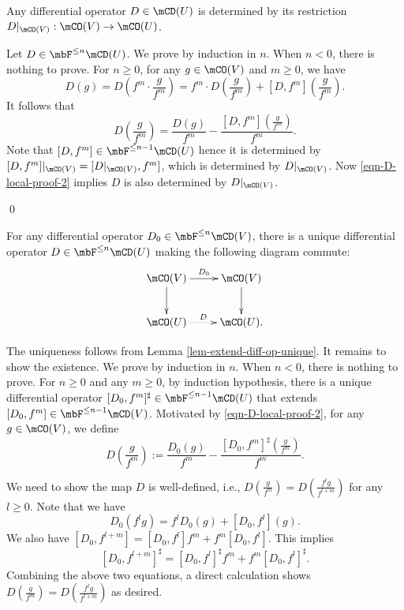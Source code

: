 	\begin{lem}
		\label{lem-extend-diff-op-unique}
		Any differential operator $D\in \mCD(U)$ is determined by its restriction $D|_{\mCO(V)}: \mCO(V) \to \mCO(U)$.
	\end{lem}

	\proof
		Let $D\in \mbF^{\le n} \mCD(U) $. We prove by induction in $n$. When $n<0$, there is nothing to prove. For $n\ge 0$, for any $g\in \mCO(V)$ and $m\ge 0$, we have
		\begin{equation}
			\label{eqn-D-local-proof-1}
			D(g) = D(f^m \cdot \frac{g}{f^m}) = f^m \cdot D(\frac{g}{f^m}) + [D,f^m](  \frac{g}{f^m}).
		\end{equation}
		It follows that
		\begin{equation}
			\label{eqn-D-local-proof-2}
			D(\frac{g}{f^m}) = \frac{D(g)}{f^m} - \frac{[D,f^m](  \frac{g}{f^m})}{f^m}.
		\end{equation}
		Note that $[D,f^m]\in \mbF^{\le n-1} \mCD(U)$ hence it is determined by $[D,f^m]|_{\mCO(V)} = [D|_{\mCO(V)}, f^m]$, which is determined by $D|_{\mCO(V)}$. Now \eqref{eqn-D-local-proof-2} implies $D$ is also determined by $D|_{\mCO(V)}$.

	\qed

	\begin{lem}
		\label{lem-extend-diff-op-exist}
		For any differential operator $D_0 \in \mbF^{\le n}\mCD(V)$, there is a unique differential operator $D\in \mbF^{\le n}\mCD(U)$ making the following diagram commute:
		\[
			\xymatrix{
				\mCO(V) \ar[d] \ar[r]^-{D_0} & \mCO(V) \ar[d]  \\
				\mCO(U) \ar@{.>}[r]^-D & \mCO(U).
			}
		\]
	\end{lem}

	\proof
		The uniqueness follows from Lemma \ref{lem-extend-diff-op-unique}. It remains to show the existence. We prove by induction in $n$. When $n<0$, there is nothing to prove. For $n\ge 0$ and any $m\ge 0$, by induction hypothesis, there is a unique differential operator $[D_0,f^m]^\sharp\in  \mbF^{\le n-1}\mCD(U)$ that extends $[D_0,f^m]\in \mbF^{\le n-1}\mCD(V)$. Motivated by \eqref{eqn-D-local-proof-2}, for any $g\in \mCO(V)$, we define
		\[
			D(\frac{g}{f^m}) := \frac{D_0(g)}{f^m} - \frac{[D_0,f^m]^\sharp(  \frac{g}{f^m})}{f^m}.
		\]

		We need to show the map $D$ is well-defined, i.e., $D(\frac{g}{f^m}) = D(\frac{f^lg}{f^{l+m}})$ for any $l\ge 0$. Note that we have 
		\[
			D_0(f^l g) = f^l D_0(g) + [D_0,f^l](g).
		\]
		We also have $[D_0, f^{l+m}] = [D_0,f^l] f^m + f^m [D_0, f^l]$. This implies 
		\[
			[D_0, f^{l+m}]^\sharp = [D_0,f^l]^\sharp f^m + f^m [D_0, f^l]^\sharp.
		\] 
		Combining the above two equations, a direct calculation shows $D(\frac{g}{f^m}) = D(\frac{f^lg}{f^{l+m}})$ as desired.

